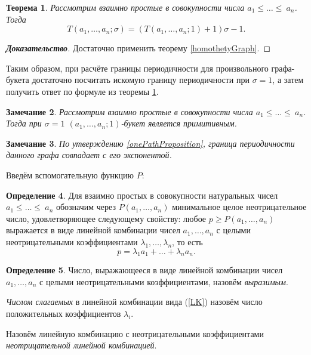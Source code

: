 \documentclass[12pt]{article}
\newtheorem{theorem}{Теорема}[section]
\newtheorem{remark}[theorem]{Замечание}
\theoremstyle{definition}
\newtheorem{definition}[theorem]{Определение}
\begin{document}
\begin{theorem}
\label{everyKFormula}
Рассмотрим взаимно простые в совокупности числа $a_1 \le \dots \le ~a_n$. Тогда
\begin{equation*}
T(a_1, \dots, a_n; \sigma) = (T(a_1, \dots, a_n; 1) + 1)\sigma - 1.
\end{equation*}
\end{theorem}
\begin{proof}[\textbf{Доказательство}] 
Достаточно применить теорему \ref{homothetyGraph}.
\end{proof}

Таким образом, при расчёте границы периодичности для произвольного графа-букета достаточно посчитать искомую границу периодичности при $\sigma = 1$, а затем получить ответ по формуле из теоремы \ref{everyKFormula}. 

\begin{remark}
Рассмотрим взаимно простые в совокупности числа $a_1 \le \dots \le ~a_n$. Тогда при $\sigma = 1$ $(a_1, \dots, a_n; 1)$-букет является примитивным.
\end{remark}

\begin{remark}
\label{rmrk:expAndT}
По утверждению \ref{onePathProposition}, граница периодичности данного графа совпадает с его экспонентой.
\end{remark}

Введём вспомогательную функцию $P$:

\begin{definition}
Для взаимно простых в совокупности натуральных чисел $a_1 \le \dots \le~a_n$ обозначим через $P(a_1, \dots, a_n)$ минимальное целое неотрицательное число, удовлетворяющее следующему свойству: любое $p \ge P(a_1, \dots, a_n)$ выражается в виде линейной комбинации чисел $a_1, \dots, a_n$ с целыми неотрицательными коэффициентами $\lambda_1, \dots, \lambda_n$, то есть
\begin{equation}
\label{LK}
p = \lambda_1 a_1 + \dots + \lambda_n a_n.
\end{equation}
\end{definition}

\begin{definition}
Число, выражающееся в виде линейной комбинации чисел $a_1, \dots, a_n$ с целыми неотрицательными коэффициентами, назовём \textit{выразимым}.

\textit{Числом слагаемых} в линейной комбинации вида (\ref{LK}) назовём число положительных коэффициентов $\lambda_i$.

Назовём линейную комбинацию с неотрицательными коэффициентами \textit{неотрицательной линейной комбинацией}.
\end{definition}
\end{document}

